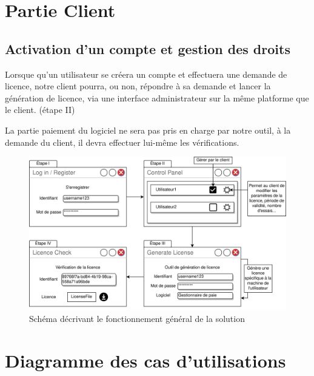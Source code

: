 \section{Partie Client}

\subsection{Activation d'un compte et gestion des droits}

Lorsque qu'un utilisateur se créera un compte et effectuera une demande de licence, notre client pourra, ou non, répondre à sa demande et lancer la génération de licence, via une interface administrateur sur la même platforme que le client. (étape II)

La partie paiement du logiciel ne sera pas pris en charge par notre outil, à la demande du client,
il devra effectuer lui-même les vérifications.
\newpage

\begin{figure}[h]
	\centering
	\vspace{4cm}
	\includegraphics[width=18cm]{main/STB.png}
	\caption{Schéma décrivant le fonctionnement général de la solution}
	\label{fig:fig1}
\end{figure}

\newpage

\section{Diagramme des cas d'utilisations}

